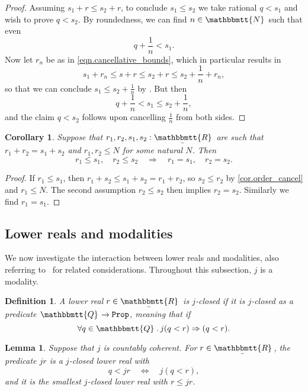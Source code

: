 \documentclass[reqno,11pt]{amsproc}
\theoremstyle{plain}
\newtheorem{corollary}[theorem]{Corollary}
\newtheorem{lemma}[theorem]{Lemma}
\newtheorem{definition}[theorem]{Definition}
\theoremstyle{definition}
\newcommand{\Const}[1]{\mathtt{#1}}
\renewcommand{\to}[1][]{\xrightarrow{#1}}
\newcommand{\ubar}[1]{\underaccent{\bar}{#1}}
\newcommand{\internal}[1]{\raisebox{-.03ex}{$\mathbbmtt{#1}$}}
\newcommand{\hs}{\hspace{1pt}}
\newcommand{\tnn}{\internal{N}\hs}
\newcommand{\tqq}{\internal{Q}\hs}
\newcommand{\trr}{\internal{R}}
\newcommand{\tlrr}{\ubar{\trr}\hs}
\newcommand{\prop}{\Const{Prop}}
\newcommand{\imp}{\Rightarrow}
\numberwithin{equation}{section}
\begin{document}
\begin{proof}
	Assuming $s_1 + r \le s_2 + r$, to conclude $s_1 \le s_2$ we take rational $q < s_1$ and wish to prove $q < s_2$. By roundedness, we can find $n \in \tnn$ such that even
	\[
		q + \frac{1}{n} < s_1.
	\]
	Now let $r_n$ be as in \eqref{eqn.cancellative_bounds}, which in particular results in
	\[
		s_1 + r_n \le s + r \le s_2 + r \le s_2 + \frac{1}{n} + r_n,
	\]
	so that we can conclude $s_1 \le s_2 + \frac{1}{n}$ by . But then
	\[
		q + \frac{1}{n} < s_1 \le s_2 + \frac{1}{n},
	\]
	and the claim $q < s_2$ follows upon cancelling $\frac{1}{n}$ from both sides.
\end{proof}

\begin{corollary}\label{cor.favorite}
	Suppose that $r_1,r_2,s_1,s_2:\tlrr$ are such that $r_1 + r_2 = s_1 + s_2$ and $r_1, r_2 \le N$ for some natural $N$. Then
	\[
		r_1\le s_1, \quad r_2\le s_2 \quad \Longrightarrow \quad r_1 = s_1, \quad r_2 = s_2.
	\]
\end{corollary}

\begin{proof}
	If $r_1 \le s_1$, then $r_1 + s_2 \le s_1 + s_2 = r_1 + r_2$, so $s_2 \le r_2$ by \cref{cor.order_cancel} and $r_1 \le N$. The second assumption $r_2 \le s_2$ then implies $r_2 = s_2$. Similarly we find $r_1 = s_1$.
\end{proof}

\subsection{Lower reals and modalities}

We now investigate the interaction between lower reals and modalities, also referring to~\cite[Section~4.3]{schultz2019temporal} for related considerations. Throughout this subsection, $j$ is a modality.

\begin{definition}
	A lower real $r \in \tlrr$ is \emph{$j$-closed} if it is $j$-closed as a predicate $\tqq \to \prop$, meaning that if
	\[
		\forall q \in \tqq \, . \, j(q < r) \imp (q < r).
	\]
\end{definition}

\begin{lemma}
	Suppose that $j$ is countably coherent. For $r \in \tlrr$, the predicate $jr$ is a $j$-closed lower real with
	\[
		q < jr \quad \Longleftrightarrow \quad j(q < r),
	\]
	and it is the smallest $j$-closed lower real with $r \le jr$.
\end{lemma}
\end{document}
